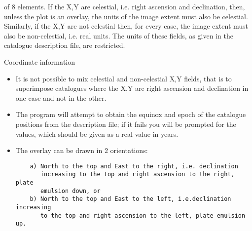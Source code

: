 \begin{description}
\begin{itemize}
of 8 elements.  
If the X,Y are celestial, i.e. right ascension and declination, then, 
unless the plot is an overlay, the units of the image extent must also be 
celestial.  
Similarly, if the X,Y are not celestial then, for every case, the image 
extent must also be non-celestial, i.e. real units.  
The units of these fields, as given in the catalogue description file, are 
restricted.
 \end{itemize}
\item{Coordinate information}
 \begin{itemize}
\item It is not possible to mix celestial and non-celestial X,Y fields,
that is to superimpose catalogues where the X,Y are right ascension
and declination in one case and not in the other.
\item The program will attempt to obtain the equinox and epoch of the
catalogue positions from the description file; if it fails you
will be prompted for the values, which should be given as a real
value in years.
\item The overlay can be drawn in 2 orientations:
\begin{verbatim}
    a) North to the top and East to the right, i.e. declination
       increasing to the top and right ascension to the right, plate
       emulsion down, or
    b) North to the top and East to the left, i.e.declination increasing
       to the top and right ascension to the left, plate emulsion up.


\end{verbatim}
\end{itemize}
\end{description}
